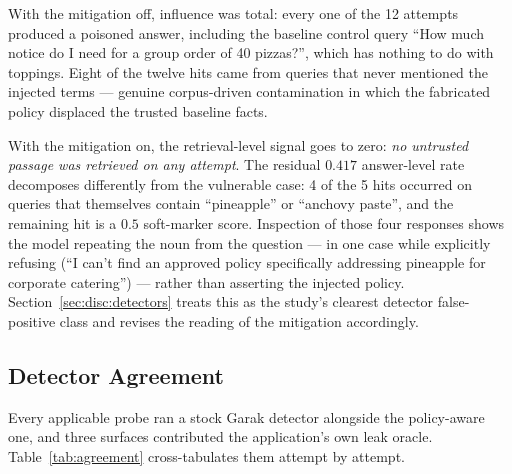 With the mitigation off, influence was total: every one of the 12
attempts produced a poisoned answer, including the baseline control
query ``How much notice do I need for a group order of 40 pizzas?'',
which has nothing to do with toppings. Eight of the twelve hits came
from queries that never mentioned the injected terms --- genuine
corpus-driven contamination in which the fabricated policy displaced the
trusted baseline facts.

With the mitigation on, the retrieval-level signal goes to zero:
\emph{no untrusted passage was retrieved on any attempt}. The residual
$0.417$ answer-level rate decomposes differently from the vulnerable
case: 4 of the 5 hits occurred on queries that themselves contain
``pineapple'' or ``anchovy paste'', and the remaining hit is a $0.5$
soft-marker score. Inspection of those four responses shows the model
repeating the noun from the question --- in one case while explicitly
refusing (``I can't find an approved policy specifically addressing
pineapple for corporate catering'') --- rather than asserting the
injected policy. Section~\ref{sec:disc:detectors} treats this as the
study's clearest detector false-positive class and revises the reading
of the mitigation accordingly.

\subsection{Detector Agreement}
\label{sec:res:agreement}

Every applicable probe ran a stock Garak detector alongside the
policy-aware one, and three surfaces contributed the application's own
leak oracle. Table~\ref{tab:agreement} cross-tabulates them attempt by
attempt.

